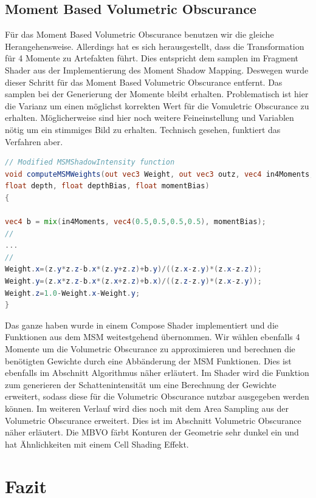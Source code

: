 \documentclass[runningheaders,a4paper]{llncs}
\begin{document}
\subsection{Moment Based Volumetric Obscurance}
Für das Moment Based Volumetric Obscurance benutzen wir die gleiche Herangehensweise. Allerdings hat es sich herausgestellt, dass die Transformation für 4 Momente zu Artefakten führt. Dies entspricht dem samplen im Fragment Shader aus der Implementierung des Moment Shadow Mapping. Deswegen wurde dieser Schritt für das Moment Based Volumetric Obscurance entfernt. Das samplen bei der Generierung der Momente bleibt erhalten. Problematisch ist hier die Varianz um einen möglichst korrekten Wert für die Vomuletric Obscurance zu erhalten. Möglicherweise sind hier noch weitere Feineinstellung und Variablen nötig um ein stimmiges Bild zu erhalten. Technisch gesehen, funktiert das Verfahren aber.
\begin{lstlisting}[language=GLSL]
// Modified MSMShadowIntensity function
void computeMSMWeights(out vec3 Weight, out vec3 outz, vec4 in4Moments, 
float depth, float depthBias, float momentBias)
{

vec4 b = mix(in4Moments, vec4(0.5,0.5,0.5,0.5), momentBias);
//
...
//
Weight.x=(z.y*z.z-b.x*(z.y+z.z)+b.y)/((z.x-z.y)*(z.x-z.z));
Weight.y=(z.x*z.z-b.x*(z.x+z.z)+b.x)/((z.z-z.y)*(z.x-z.y));
Weight.z=1.0-Weight.x-Weight.y;
}
\end{lstlisting}
Das ganze haben wurde in einem Compose Shader implementiert und die Funktionen aus dem MSM weitestgehend übernommen.
Wir wählen ebenfalls 4 Momente um die Volumetric Obscurance zu approximieren und berechnen die benötigten Gewichte durch eine Abbänderung der MSM Funktionen. Dies ist ebenfalls im Abschnitt Algorithmus näher erläutert.
Im Shader wird die Funktion zum generieren der Schattenintensität um eine Berechnung der Gewichte erweitert, sodass diese für die Volumetric Obscurance nutzbar ausgegeben werden können. Im weiteren Verlauf wird dies noch mit dem Area Sampling aus der Volumetric Obscurance erweitert. Dies ist im Abschnitt Volumetric Obscurance näher erläutert.
Die MBVO färbt Konturen der Geometrie sehr dunkel ein und hat Ähnlichkeiten mit einem Cell Shading Effekt.



\section{Fazit}


\end{document}
